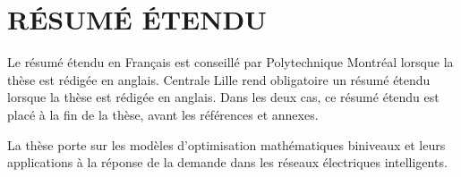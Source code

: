 \chapter*{RÉSUMÉ ÉTENDU}\thispagestyle{headings}

Le résumé étendu en Français est conseillé par Polytechnique Montréal lorsque la
thèse est rédigée en anglais. Centrale Lille rend obligatoire un résumé étendu
lorsque la thèse est rédigée en anglais. Dans les deux cas, ce résumé étendu est
placé à la fin de la thèse, avant les références et annexes.

La thèse porte sur les modèles d'optimisation mathématiques biniveaux
et leurs applications à la réponse de la demande dans les réseaux
électriques intelligents.
